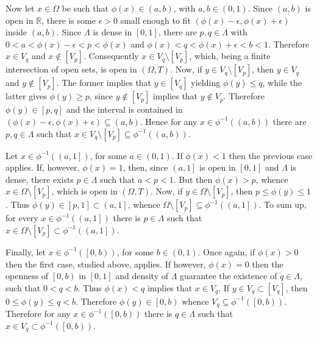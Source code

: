 \documentclass[a4paper]{article}
\newcommand{\clo}[1]{\left [{#1}\right]}
\newcommand{\brac}[1]{{\left({#1}\right)}}
\begin{document}
Now let $x\in \Omega$ be such that $\phi(x) \in \brac{a,b}$, with $a,b \in \brac{0,1}$. Since $\brac{a,b}$ is open in $\mathbb{R}$, there is some $\epsilon > 0$ small enough to fit $\brac{\phi(x)-\epsilon, \phi(x)+\epsilon}$ inside $\brac{a,b}$. Since $\Lambda$ is dense in $\clo{0,1}$, there are $p,q\in \Lambda$ with $0<a<\phi(x)-\epsilon<p<\phi(x)$ and $\phi(x)<q<\phi(x)+\epsilon<b<1$. Therefore $x\in V_q$ and $x\notin \clo{V_p}$. Consequently $x\in V_q\setminus \clo{V_p}$, which, being a finite intersection of open sets, is open in $\brac{\Omega, T}$. Now, if $y\in V_q\setminus \clo{V_p}$, then $y\in V_q$ and $y\notin \clo{V_p}$. The former implies that $y\in \clo{V_q}$ yielding $\phi(y)\leq q$, while the latter gives $\phi(y) \geq p$, since $y\notin \clo{V_p}$ implies that $ y\notin V_p$. Therefore $\phi(y)\in \clo{p,q}$ and the interval is contained in $\brac{\phi(x)-\epsilon, \phi(x)+\epsilon} \subseteq \brac{a,b}$. Hence for any $x\in \phi^{-1}\brac{\brac{a,b}}$ there are $p,q\in \Lambda$ such that $x \in V_q\setminus \clo{V_p} \subseteq \phi^{-1}\brac{\brac{a,b}}$.

Let $x\in \phi^{-1}\brac{\left ( a, 1 \right ]}$, for some $a\in \brac{0,1}$. If $\phi(x)<1$ then the previous case applies. If, however, $\phi(x) = 1$, then, since $\left ( a, 1 \right ]$ is open in $\clo{0,1}$ and $\Lambda$ is dense, there exists $p\in \Lambda$ such that $a < p < 1$. But then $\phi(x) > p$, whence $x\in \Omega\setminus \clo{V_p}$, which is open in $\brac{\Omega, T}$. Now, if $y\in \Omega\setminus \clo{V_p}$, then $p\leq \phi(y)\leq 1$. Thus $\phi(y) \in \clo{p,1} \subset \left ( a, 1 \right ]$, whence $\Omega\setminus \clo{V_p}\subseteq \phi^{-1}\brac{\left ( a, 1 \right ]}$. To sum up, for every $x\in \phi^{-1}\brac{\left ( a, 1\right ]}$ there is $p\in \Lambda$ such that $x\in \Omega\setminus \clo{V_p} \subset \phi^{-1}\brac{\left ( a, 1 \right ]}$.

Finally, let $x\in \phi^{-1}\brac{\left [0, b \right )}$, for some $b\in \brac{0,1}$. Once again, if $\phi(x) > 0$ then the first case, studied above, applies. If however, $\phi(x)=0$ then the openness of $\left [ 0, b \right )$ in $\clo{0,1}$ and density of $\Lambda$ guarantee the existence of $q\in \Lambda$, such that $0 < q < b$. Thus $\phi(x) < q$ implies that $x\in V_q$. If $y\in V_q\subset \clo{V_q}$, then $0\leq \phi(y) \leq q < b$. Therefore $\phi(y) \in \left [0, b \right )$ whence $V_q \subseteq \phi^{-1}\brac{\left [ 0, b \right ) }$. Therefore for any $x\in \phi^{-1}\brac{\left [0, b \right )}$ there is $q\in \Lambda$ such that $x\in V_q \subset \phi^{-1}\brac{\left [0, b \right )}$.
\end{document}
